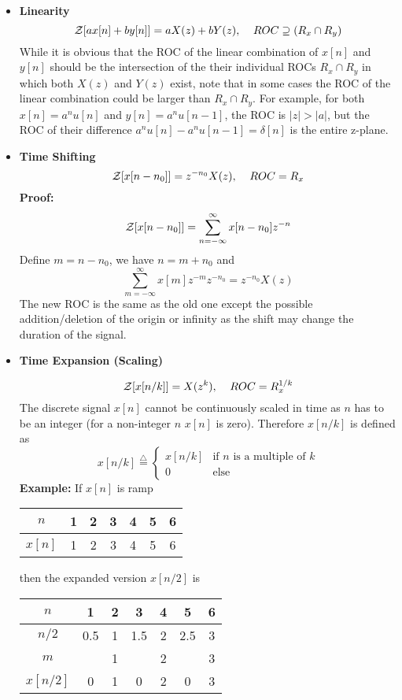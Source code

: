 \begin{itemize}
\item {\bf Linearity}
\[
{\cal Z}[a x[n]+b y[n]]=aX(z)+bY(z), \;\;\;\;ROC \supseteq (R_x \cap R_y) \]
While it is obvious that the ROC of the linear combination of $x[n]$ and 
$y[n]$ should be the intersection of the their individual ROCs $R_x \cap R_y$
in which both $X(z)$ and $Y(z)$ exist, note that in some cases the ROC of the
linear combination could be larger than $R_x \cap R_y$. For example, for both 
$x[n]=a^n u[n]$ and $y[n]=a^n u[n-1]$, the ROC is $|z|>|a|$, but the ROC of 
their difference $a^n u[n]-a^n u[n-1]=\delta[n]$ is the entire z-plane.

\item {\bf Time Shifting}
\[	{\cal Z}[x[n-n_0]]=z^{-n_0} X(z),\;\;\;\;ROC=R_x 	\]
{\bf Proof: }
\[	{\cal Z}[x[n-n_0]]=\sum_{n=-\infty}^\infty x[n-n_0]z^{-n}	\]
Define $m=n-n_0$, we have $n=m+n_0$ and
\[	\sum_{m=-\infty}^\infty x[m]z^{-m}z^{-n_0}=z^{-n_0} X(z)	\]
The new ROC is the same as the old one except the possible addition/deletion 
of the origin or infinity as the shift may change the duration of the signal.

\item {\bf Time Expansion (Scaling)}

\[	{\cal Z}[x[n/k]]=X(z^k),\;\;\;\;ROC=R_x^{1/k}	\]
The discrete signal $x[n]$ cannot be continuously scaled in time as $n$ has 
to be an integer (for a non-integer $n$ $x[n]$ is zero). Therefore $x[n/k]$ is
defined as
\[	x[n/k]\stackrel{\triangle}{=}\left\{ \begin{array}{ll}
	x[n/k] & \mbox{if $n$ is a multiple of $k$} \\ 0 & \mbox{else}
	\end{array} \right.
\]
{\bf Example: } If $x[n]$ is ramp

\begin{tabular}{c|cccccc} \hline
 $n$ & 1 & 2 & 3 & 4 & 5 & 6 \\ \hline $x[n]$ & 1 & 2 & 3 & 4 & 5 & 6 \\ \hline 
\end{tabular}

then the expanded version $x[n/2]$ is 

\begin{tabular}{c|cccccc} \hline
 $n$ & 1 & 2 & 3 & 4 & 5 & 6 \\ \hline
 $n/2$ & 0.5 & 1 & 1.5 & 2 & 2.5 & 3 \\ \hline
 $m$ &	     & 1 &     & 2 &     & 3 \\ \hline
 $x[n/2]$ & 0 & 1 & 0 & 2 & 0 & 3 \\ \hline 
\end{tabular}


\end{itemize}
